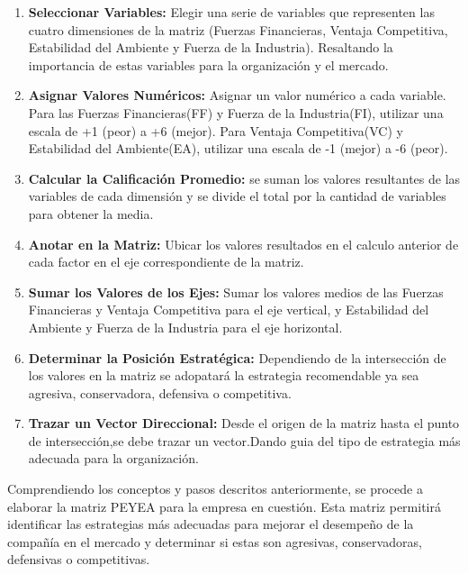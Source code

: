 \begin{enumerate}
    \item \textbf{Seleccionar Variables:} Elegir una serie de variables que representen las cuatro dimensiones de la matriz (Fuerzas Financieras, Ventaja Competitiva, Estabilidad del Ambiente y Fuerza de la Industria). Resaltando la importancia de estas variables para la organización y el mercado.
    \item \textbf{Asignar Valores Numéricos:} Asignar un valor numérico a cada variable. Para las Fuerzas Financieras(FF) y Fuerza de la Industria(FI), utilizar una escala de +1 (peor) a +6 (mejor). Para Ventaja Competitiva(VC) y Estabilidad del Ambiente(EA), utilizar una escala de -1 (mejor) a -6 (peor).
    \item \textbf{Calcular la Calificación Promedio:} se suman los valores resultantes de las variables de cada dimensión y se divide el total por la cantidad de variables para obtener la media.
    \item \textbf{Anotar en la Matriz:} Ubicar los valores resultados en el calculo anterior de cada factor en el eje correspondiente de la matriz.
    \item \textbf{Sumar los Valores de los Ejes:} Sumar los valores medios de las Fuerzas Financieras y Ventaja Competitiva para el eje vertical, y Estabilidad del Ambiente y Fuerza de la Industria para el eje horizontal.
    \item \textbf{Determinar la Posición Estratégica:} Dependiendo de la intersección de los valores en la matriz se adopatará la estrategia recomendable ya sea agresiva, conservadora, defensiva o competitiva.
    \item \textbf{Trazar un Vector Direccional:} Desde el origen de la matriz hasta el punto de intersección,se debe trazar un vector.Dando guia del tipo de estrategia más adecuada para la organización.
\end{enumerate}

Comprendiendo los conceptos y pasos descritos anteriormente, se procede a elaborar la matriz PEYEA para la empresa en cuestión. Esta matriz permitirá identificar las estrategias más adecuadas para mejorar el desempeño de la compañía en el mercado y determinar si estas son agresivas, conservadoras, defensivas o competitivas.

